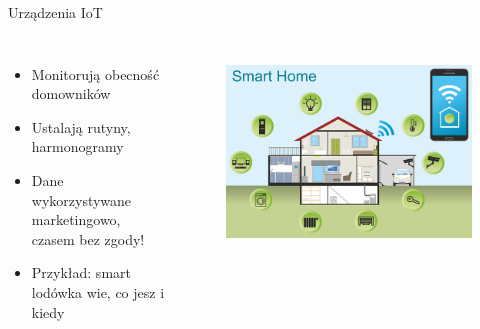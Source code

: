\begin{frame}{Urządzenia IoT}
\begin{columns}[c]
    \begin{itemize}
        \item Monitorują obecność domowników
        \item Ustalają rutyny, harmonogramy
        \item Dane wykorzystywane marketingowo, czasem bez zgody!
        \item Przykład: smart lodówka wie, co jesz i kiedy \cite{zrodlo2}
      \end{itemize}
    \centering
    \begin{figure}
        \centering
        \includegraphics[width=1\textwidth]{images/smart-home.png}
        \label{fig:smart-home}
    \end{figure}    
\end{columns}
\end{frame}

